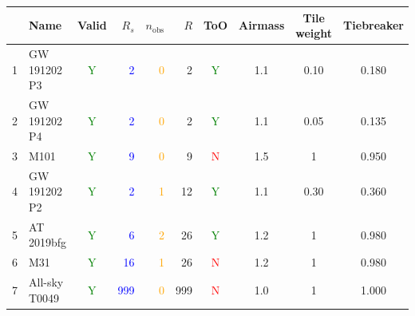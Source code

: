 \begin{colsection}
\begin{colsection}
\begin{table}[t]
    \begin{center}
        \begin{tabular}{c|l|c|rrr|c|ccc} %
            & Name & Valid & $R_s$ & $n_\text{obs}$ & $R$ & ToO & Airmass & Tile weight & Tiebreaker
            \\
            \midrule
            1 &
            GW 191202 P3 &
            \textcolor{Green}{Y} &
            \textcolor{Blue}{2} &
            \textcolor{Orange}{0} &
            2 &
            \textcolor{Green}{Y} &
            1.1 &
            0.10 &
            0.180 \\

            2 &
            GW 191202 P4 &
            \textcolor{Green}{Y} &
            \textcolor{Blue}{2} &
            \textcolor{Orange}{0} &
            2 &
            \textcolor{Green}{Y} &
            1.1 &
            0.05 &
            0.135 \\

            3 &
            M101 &
            \textcolor{Green}{Y} &
            \textcolor{Blue}{9} &
            \textcolor{Orange}{0} &
            9 &
            \textcolor{Red}{N} &
            1.5 &
            1 &
            0.950 \\

            4 &
            GW 191202 P2 &
            \textcolor{Green}{Y} &
            \textcolor{Blue}{2} &
            \textcolor{Orange}{1} &
            12 &
            \textcolor{Green}{Y} &
            1.1 &
            0.30 &
            0.360 \\

            5 &
            AT 2019bfg &
            \textcolor{Green}{Y} &
            \textcolor{Blue}{6} &
            \textcolor{Orange}{2} &
            26 &
            \textcolor{Green}{Y} &
            1.2 &
            1 &
            0.980 \\

            6 &
            M31 &
            \textcolor{Green}{Y} &
            \textcolor{Blue}{16} &
            \textcolor{Orange}{1} &
            26 &
            \textcolor{Red}{N} &
            1.2 &
            1 &
            0.980 \\

            7 &
            All-sky T0049 &
            \textcolor{Green}{Y} &
            \textcolor{Blue}{999} &
            \textcolor{Orange}{0} &
            999 &
            \textcolor{Red}{N} &
            1.0 &
            1 &
            1.000 \\


\end{tabular}
\end{center}
\end{table}
\end{colsection}
\end{colsection}
